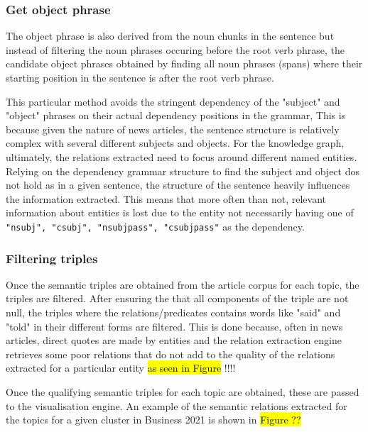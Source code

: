 \subsubsection{Get object phrase}
The object phrase is also derived from the noun chunks in the sentence but instead of filtering the noun phrases occuring before the root verb phrase, the candidate object phrases obtained by finding all noun phrases (spans) where their starting position in the sentence is after the root verb phrase.

This particular method avoids the stringent dependency of the "subject" and "object" phrases on their actual dependency positions in the grammar, This is because given the nature of news articles, the sentence structure is relatively complex with several different subjects and objects. For the knowledge graph, ultimately, the relations extracted need to focus around different named entities. Relying on the dependency grammar structure to find the subject and object dos not hold as in a given sentence, the structure of the sentence heavily influences the information extracted. This means that more often than not, relevant information about entities is lost due to the entity not necessarily having one of \texttt{"nsubj", "csubj", "nsubjpass",	"csubjpass"} as the dependency. 


\subsubsection{Filtering triples}
Once the semantic triples are obtained from the article corpus for each topic, the triples are filtered. After ensuring the that all components of the triple are not null, the triples where the relations/predicates contains words like "said" and "told" in their different forms are filtered. This is done because, often in news articles, direct quotes are made by entities and the relation extraction engine retrieves some poor relations that do not add to the quality of the relations extracted for a particular entity \hl{as seen in Figure} !!!! 


Once the qualifying semantic triples for each topic are obtained, these are passed to the visualisation engine. An example of the semantic relations extracted for the topics for a given cluster in Business 2021 is shown in \hl{Figure ??}